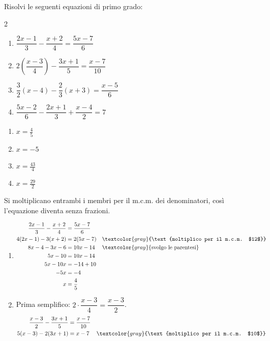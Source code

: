 \begin{question}[ID=2.5, subtitle={Equazioni di primo grado con frazioni}, difficulty=difficile, tags={equazioni lineari}]
Risolvi le seguenti equazioni di primo grado:
\begin{multicols}{2}
\begin{enumerate}[leftmargin=3cm]
    \item $\dfrac{2x-1}{3} - \dfrac{x+2}{4} = \dfrac{5x-7}{6}$
    \item $2\left(\dfrac{x-3}{4}\right) - \dfrac{3x+1}{5} = \dfrac{x-7}{10}$
    \item $\dfrac{3}{2}(x-4) - \dfrac{2}{3}(x+3) = \dfrac{x-5}{6}$
    \item $\dfrac{5x-2}{6} - \dfrac{2x+1}{3} + \dfrac{x-4}{2} = 7$
\end{enumerate}
\end{multicols}
\begin{solution}
\begin{enumerate}
    \item $x=\tfrac45$
    \item $x=-5$
    \item $x=\tfrac{43}{4}$
    \item $x=\tfrac{29}{2}$
\end{enumerate}
\end{solution}
\begin{explanation}
Si moltiplicano entrambi i membri per il m.c.m. dei denominatori, così l'equazione diventa senza frazioni.
\begin{enumerate}
    \item \[\begin{aligned}
    \dfrac{2x-1}{3}-\dfrac{x+2}{4} &= \dfrac{5x-7}{6}\\
    4(2x-1)-3(x+2) &= 2(5x-7) && \textcolor{gray}{\text{moltiplico per il m.c.m. $12$}}\\
    8x-4-3x-6 &= 10x-14 && \textcolor{gray}{\text{svolgo le parentesi}}\\
    5x-10 &= 10x-14\\
    5x-10x &= -14+10\\
    -5x &= -4\\
    x &= \dfrac45
    \end{aligned}\]
    \item Prima semplifico: $2\cdot\dfrac{x-3}{4}=\dfrac{x-3}{2}$.
    \[\begin{aligned}
    \dfrac{x-3}{2}-\dfrac{3x+1}{5} &= \dfrac{x-7}{10}\\
    5(x-3)-2(3x+1) &= x-7 && \textcolor{gray}{\text{moltiplico per il m.c.m. $10$}}\\

\end{aligned}\]
\end{enumerate}
\end{explanation}
\end{question}
